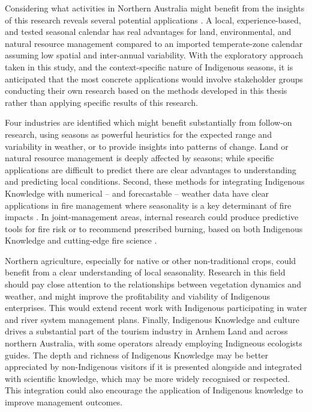 Considering what activities in Northern Australia might benefit from the
insights of this research reveals several potential applications
\citep[see eg.][]{whitepaper}.  A local, experience-based, and tested seasonal calendar has real
advantages for land, environmental, and natural resource management compared
to an imported temperate-zone calendar assuming low spatial and inter-annual variability.
%
With the exploratory approach taken in this study, and the context-specific
nature of Indigenous seasons, it is anticipated that the most concrete applications
would involve stakeholder groups conducting their own research based on the
methods developed in this thesis rather than applying specific results of this research.


Four industries are identified which might benefit substantially from follow-on
research, using seasons as powerful heuristics for the expected range
and variability in weather, or to provide insights into patterns of change.
%
Land or natural resource management is deeply affected by seasons; while
specific applications are difficult to predict there are clear advantages
to understanding and predicting local conditions.
%
Second, these methods for integrating Indigenous Knowledge with numerical --
and forecastable -- weather data have clear applications in fire management
where seasonality is a key determinant of fire impacts \citep{driscoll2010}.
In joint-management areas, internal research could produce predictive tools
for fire risk or to recommend prescribed burning, based on both Indigenous
Knowledge and cutting-edge fire science \citep[see eg.][]{bowman2003,yibarbuk2001}.

Northern agriculture, especially for native or other non-traditional crops,
could benefit from a clear understanding of local seasonality.  Research in
this field should pay close attention to the relationships between vegetation
dynamics and weather, and might improve the profitability and viability of Indigenous
enterprises.  This would extend recent work \citep[eg.][]{jackson2012,jackson2015}
with Indigenous participating in water and river system management plans.
%
Finally, Indigenous Knowledge and culture drives a substantial part of the
tourism industry in Arnhem Land and across northern Australia, with some
operators already employing Indigneous ecologists guides.  The depth and
richness of Indigenous Knowledge may be better appreciated by non-Indigenous visitors if
it is presented alongside and integrated with scientific knowledge, which
may be more widely recognised or respected.  This integration could also
encourage the application of Indigenous knowledge to improve management outcomes.


